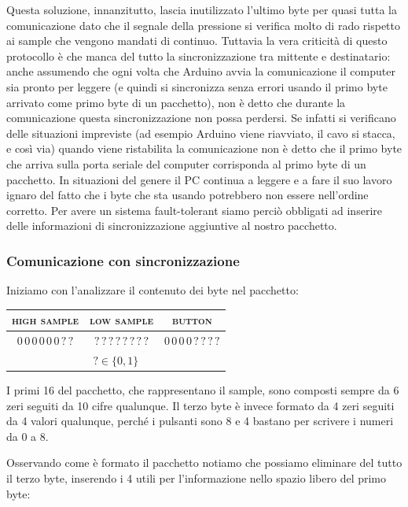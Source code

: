 \documentclass[a4paper,11pt]{article}
\begin{document}
Questa soluzione, innanzitutto, lascia inutilizzato l'ultimo byte per quasi tutta la comunicazione dato che il segnale della pressione si verifica molto di rado rispetto ai sample che vengono mandati di continuo. Tuttavia la vera criticità di questo protocollo è che manca del tutto la sincronizzazione tra mittente e destinatario: anche assumendo che ogni volta che Arduino avvia la comunicazione il computer sia pronto per leggere (e quindi si sincronizza senza errori usando il primo byte arrivato come primo byte di un pacchetto), non è detto che durante la comunicazione questa sincronizzazione non possa perdersi. Se infatti si verificano delle situazioni impreviste (ad esempio Arduino viene riavviato, il cavo si stacca, e così via) quando viene ristabilita la comunicazione non è detto che il primo byte che arriva sulla porta seriale del computer corrisponda al primo byte di un pacchetto. In situazioni del genere il PC continua a leggere e a fare il suo lavoro ignaro del fatto che i byte che sta usando potrebbero non essere nell'ordine corretto. Per avere un sistema fault-tolerant siamo perciò obbligati ad inserire delle informazioni di sincronizzazione aggiuntive al nostro pacchetto.

\subsubsection{Comunicazione con sincronizzazione}
Iniziamo con l'analizzare il contenuto dei byte nel pacchetto:

\begin{table}[h]
\centering
\begin{tabular}{ccc}
\textsc{high sample}           & \textsc{low sample}           & \textsc{button}                             \\ \hline
\multicolumn{1}{|c|}{$0\, 0\, 0\, 0\, 0\, 0\, ?\, ? $} & \multicolumn{1}{c|}{$?\,?\,?\,?\,?\,?\,?\,?$} & \multicolumn{1}{c|}{$0\,0\,0\,0\,?\,?\,?\,?$} \\ \hline
\multicolumn{3}{c}{$? \in \{0, 1\}$}
\end{tabular}
\end{table}

I primi \SI{16}{\bit} del pacchetto, che rappresentano il sample, sono composti sempre da \num{6} zeri seguiti da \num{10} cifre qualunque. Il terzo byte è invece formato da \num{4} zeri seguiti da \num{4} valori qualunque, perché i pulsanti sono \num{8} e \SI{4}{\bit} bastano per scrivere i numeri da \num{0} a \num{8}.

Osservando come è formato il pacchetto notiamo che possiamo eliminare del tutto il terzo byte, inserendo i \SI{4}{\bit} utili per l'informazione nello spazio libero del primo byte:
\end{document}
